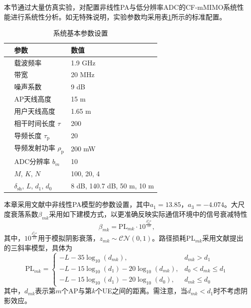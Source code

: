 本节通过大量仿真实验，对配置非线性PA与低分辨率ADC的CF-mMIMO系统性能进行系统性分析。如无特殊说明，实验参数均采用表\ref{table1}所示的标准配置。
\begin{table}[H]
  \begin{center}
    \caption{系统基本参数设置}\label{table1}
    \begin{tabular}{@{}lll@{}}
			\toprule
                          & \textbf{参数}                        & \textbf{数值} \\ \midrule
 											 & 载波频率                   	& 1.9 GHz             \\
                          & 带宽                   				 	& 20 MHz          \\
                          & 噪声系数           & 9 dB   \\
                          & AP天线高度 & 15 m     \\
                          & 用户天线高度   & 1.65 m           \\
                          & 相干时间长度 $\tau$        & 200\\
                          & 导频长度 $\tau_\text{p}$   & 20  \\
                          & 导频发射功率 $\rho_\text{p}$              & 200 mW             \\
                          & ADC分辨率 $b_m$           &10   \\
                          & $M$, $K$, $N$    & 100, 20, 4\\
                          &$\delta _\text{sh}$, $L$, $d_1$, $d_0$   & 8 dB, 140.7 dB, 50 m, 10 m    \\ \midrule
			\end{tabular}
  \end{center}
\end{table}

本章采用文献\textcite{chapterthree10}中非线性PA模型的参数设置，其中$a_1=13.85$，$a_3=-4.074$。大尺度衰落系数$\beta_{mk}$采用如下建模方式，以更准确反映实际通信环境中的信号衰减特性
\begin{equation}
\beta_{mk} = \text{PL}_{mk} \cdot 10^{\frac{\delta_{\text{sh}}^{z_{mk}}}{10}},
\end{equation}
其中，$10^{\frac{\delta_{\text{sh}}^{z_{mk}}}{10}}$用于模拟阴影衰落，$z_{mk} \sim \mathcal{CN}(0,1)$。路径损耗$\text{PL}_{mk}$采用文献\textcite{chapterone7}提出的三斜率模型，具体为
\begin{equation}
\text{PL}_{mk} = \left\{\begin{array}{ll}
-L-35 \log_{10}(d_{mk}), & d_{mk} > d_1 \\
-L-15 \log_{10}(d_1) - 20 \log_{10}(d_{mk}), & d_0 < d_{mk} \leq d_1 \\
-L-15 \log_{10}(d_1) - 20 \log_{10}(d_0), & d_{mk} \leq d_0
\end{array}\right.
\end{equation}
其中，$d_{mk}$表示第$m$个AP与第$k$个UE之间的距离。需注意，当$d_{mk} < d_1$时不考虑阴影效应。

